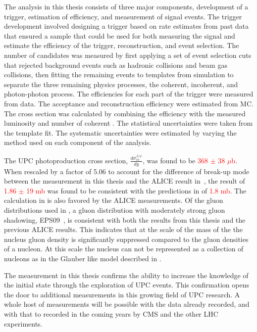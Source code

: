     The analysis in this thesis consists of three major components, development
      of a trigger, estimation of efficiency, and measurement of signal events.
    The trigger development involved designing a trigger based on rate estimates
      from past data that ensured a sample that could be used for both measuring
      the signal and estimate the efficiency of the trigger, reconstruction, and
      event selection.
    The number of \JPsi{} candidates was measured by first applying a set 
      of event selection cuts that rejected background events such as hadronic
      collisions and beam gas collisions, then fitting the remaining events to
      templates from simulation to separate the three remaining physics processes,
      the coherent, incoherent, and photon-photon process.
    The efficiencies for each part of the trigger were measured from data. 
    The acceptance and reconstruction efficiency were estimated from MC.
    The cross section was calculated by combining the efficiency with the 
      measured luminosity and number of coherent \JPsi{}.
    The statistical uncertainties were taken from the template fit.
    The systematic uncertainties were estimated by varying the method used on 
      each component of the analysis. 
  
    The UPC \JPsi{} photoproduction cross section, $\frac{d\sigma^{J/\psi}_{co}}{dy}$,
      was found to be \textcolor{red}{368 $\pm$ 38 $\mu$b}. 
    When rescaled by a factor of 5.06 to account for the difference of break-up mode between 
      the measurement in this thesis and the ALICE result in~\cite{Abelev:2012ba,Abbas:2013oua}, the 
      result of \textcolor{red}{1.86 $\pm$ 19 mb} was found to be consistent with the 
      predictions in \cite{pQCD2013.02} of \textcolor{red}{1.8 mb}.  
    The calculation in \cite{pQCD2013.02} is also favored by the ALICE measurements. 
    Of the gluon distributions used in \cite{pQCD2013.02}, a gluon distribution with 
      moderately strong gluon shadowing, EPS09~\cite{Eskola:2009uj}, is consistent with both the results from this
      thesis and the previous ALICE results. 
    This indicates that at the scale of the mass of the \JPsi{} the nucleus gluon density is 
      significantly suppressed compared to the gluon densities of a nucleon.
    At this scale the nucleus can not be represented as a collection of nucleons as in the 
      Glauber like model described in \cite{vmd1999}.
  
    The measurement in this thesis confirms the ability to increase the knowledge of the 
      initial state through the exploration of UPC events. 
    This confirmation opens the door to additional measurements in this growing field of UPC
      research.
    A whole host of measurements will be possible with the data already recorded,
      and with that to recorded in the coming years by CMS and the other LHC 
      experiments. 
